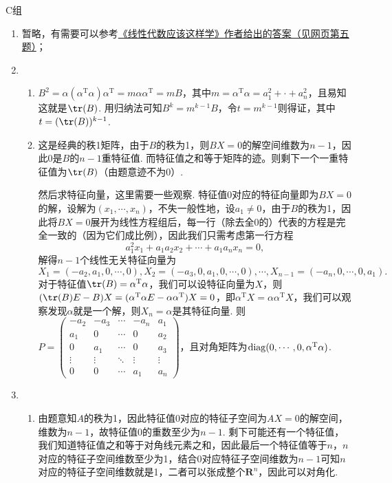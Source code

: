 \centerline{\heiti C组}
\begin{enumerate}
    \item 暂略，有需要可以参考\href{https://linearalgebras.com/5c.html}{《线性代数应该这样学》作者给出的答案（见网页第五题）}；

    \item \begin{enumerate}
        \item $B^2=\alpha(\alpha^\mathrm{T}\alpha)\alpha^\mathrm{T}=m\alpha\alpha^\mathrm{T}=mB$，其中$m=\alpha^\mathrm{T}\alpha=a_1^2+\cdot+a_n^2$，且易知这就是$\tr(B)$. 用归纳法可知$B^k=m^{k-1}B$，令$t=m^{k-1}$则得证，其中$t=(\tr(B))^{k-1}$.
        \item 这是经典的秩1矩阵，由于$B$的秩为1，则$BX=0$的解空间维数为$n-1$，因此0是$B$的$n-1$重特征值. 而特征值之和等于矩阵的迹。则剩下一个一重特征值为$\tr(B)$（由题意迹不为0）.

        然后求特征向量，这里需要一些观察. 特征值0对应的特征向量即为$BX=0$的解，设解为$(x_1,\cdots,x_n)$，不失一般性地，设$a_1\neq 0$，由于$B$的秩为1，因此将$BX=0$展开为线性方程组后，每一行（除去全0的）代表的方程是完全一致的（因为它们成比例），因此我们只需考虑第一行方程
        \[a_1^2x_1+a_1a_2x_2+\cdots+a_1a_nx_n=0,\]
        解得$n-1$个线性无关特征向量为
        \[X_1=(-a_2,a_1,0,\cdots,0),X_2=(-a_3,0,a_1,0,\cdots,0),\cdots,X_{n-1}=(-a_n,0,\cdots,0,a_1).\]
        对于特征值$\tr(B)=\alpha^\mathrm{T}\alpha$，我们可以设特征向量为$X$，则$(\tr(B)E-B)X=(\alpha^\mathrm{T}\alpha E-\alpha\alpha^\mathrm{T})X=0$，即$\alpha^\mathrm{T}X=\alpha\alpha^\mathrm{T}X$，我们可以观察发现$\alpha$就是一个解，则$X_n=\alpha$是其特征向量. 则$P=\begin{pmatrix}
            -a_2 & -a_3 & \cdots & -a_n & a_1 \\ a_1 & 0 & \cdots & 0 & a_2 \\ 0 & a_1 & \cdots & 0 & a_3 \\ \vdots & \vdots & \ddots & \vdots & \vdots \\ 0 & 0 & \cdots & a_1 & a_n
        \end{pmatrix}$，且对角矩阵为$\operatorname{diag}(0,\cdots,0,\alpha^\mathrm{T}\alpha)$.
    \end{enumerate}

    \item \begin{enumerate}
        \item 由题意知$A$的秩为1，因此特征值0对应的特征子空间为$AX=0$的解空间，维数为$n-1$，故特征值0的重数至少为$n-1$. 剩下可能还有一个特征值，我们知道特征值之和等于对角线元素之和，因此最后一个特征值等于$n$，$n$对应的特征子空间维数至少为1，结合0对应特征子空间维数为$n-1$可知$n$对应的特征子空间维数就是1，二者可以张成整个$\mathbf{R}^n$，因此可以对角化.


\end{enumerate}
\end{enumerate}
